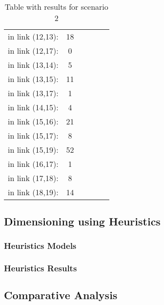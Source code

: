 \begin{table}[h!]
\begin{tabular}{|| c | c || c | c || c | c ||}
in link (12,13): & 18& & & & \\
in link (12,17): & 0& & & & \\
in link (13,14): & 5& & & & \\
in link (13,15): & 11& & & & \\
in link (13,17): & 1& & & & \\
in link (14,15): & 4& & & & \\
in link (15,16): & 21& & & & \\
in link (15,17): & 8& & & & \\
in link (15,19): & 52& & & & \\
in link (16,17): & 1& & & & \\
in link (17,18): & 8& & & & \\
in link (18,19): & 14& & & & \\
 \hline
\end{tabular}
\caption{Table with results for scenario 2}
\label{result_ILP4_TP}
\end{table}

\newpage

\subsection{Dimensioning using Heuristics}

\subsubsection{Heuristics Models}

\subsubsection{Heuristics Results}

\subsection{Comparative Analysis} 